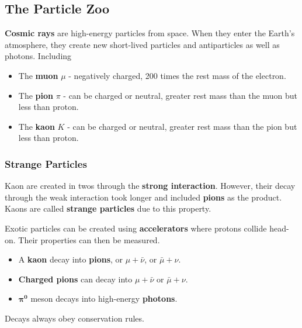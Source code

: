 \subsection{The Particle Zoo}

\textbf{Cosmic rays} are high-energy particles from space. When they enter the Earth's atmosphere, they create new short-lived particles and antiparticles as well as photons. Including
\begin{itemize}
    \item The \textbf{muon} $\mu$ - negatively charged, 200 times the rest mass of the electron.
    \item The \textbf{pion} $\pi$ - can be charged or neutral, greater rest mass than the muon but less than proton.
    \item The \textbf{kaon} $K$ - can be charged or neutral, greater rest mass than the pion but less than proton.
\end{itemize}

\subsubsection*{Strange Particles}

Kaon are created in twos through the \textbf{strong interaction}. However, their decay through the weak interaction took longer and included \textbf{pions} as the product. Kaons are called \textbf{strange particles} due to this property.

Exotic particles can be created using \textbf{accelerators} where protons collide head-on. Their properties can then be measured.
\begin{itemize}
    \item A \textbf{kaon} decay into \textbf{pions}, or $\mu+\bar\nu$, or $\bar\mu+\nu$.
    \item \textbf{Charged pions} can decay into $\mu+\bar\nu$ or $\bar\mu+\nu$.
    \item $\mathbf{\pi^0}$ meson decays into high-energy \textbf{photons}.
\end{itemize}

Decays always obey conservation rules.
